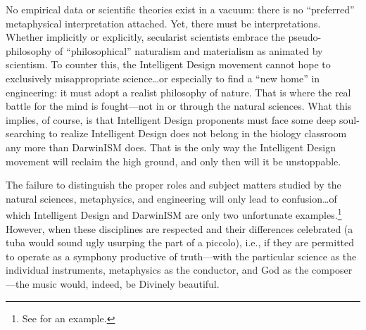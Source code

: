 No empirical data or scientific theories exist in a vacuum: there is no ``preferred'' metaphysical interpretation attached. Yet, there must be interpretations. Whether implicitly or explicitly, secularist scientists embrace the pseudo-philosophy of ``philosophical'' naturalism and materialism as animated by scientism. To counter this, the Intelligent Design movement cannot hope to exclusively misappropriate science\ldots or especially to find a ``new home'' in engineering: it must adopt a realist philosophy of nature. That is where the real battle for the mind is fought---not in or through the natural sciences. What this implies, of course, is that Intelligent Design proponents must face some deep soul-searching to realize Intelligent Design does not belong in the biology classroom any more than DarwinISM does. That is the only way the Intelligent Design movement will reclaim the high ground, and only then will it be unstoppable.

The failure to distinguish the proper roles and subject matters studied by the natural sciences, metaphysics, and engineering will only lead to confusion\ldots of which Intelligent Design and DarwinISM are only two unfortunate examples.\footnote{See \citet[][p.~372]{sigcell} for an example.} However, when these disciplines are respected and their differences celebrated (a tuba would sound ugly usurping the part of a piccolo), i.e., if they are permitted to operate as a symphony productive of truth---with the particular science as the individual instruments, metaphysics as the conductor, and God as the composer---the music would, indeed, be Divinely beautiful.

